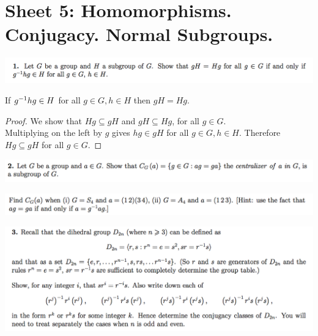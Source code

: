 \documentclass[12pt]{article}
\begin{document}
\section{Sheet 5: Homomorphisms. Conjugacy. Normal Subgroups.}

\begin{mdframed}
\includegraphics[width=400pt]{img/abstract-algebra-oxford-M1-5-1.png}
\end{mdframed}

\begin{claim*}
  If $g^{-1}hg \in H$ for all $g \in G, h \in H$ then $gH = Hg$.
\end{claim*}

\begin{proof} We show that $Hg \subseteq gH$ and $gH \subseteq Hg$, for all $g \in G$.\\

Multiplying on the left by $g$ gives $hg \in gH$ for all $g \in G, h \in H$. Therefore $Hg \subseteq gH$ for all $g \in G$.
\end{proof}

\begin{mdframed}
\includegraphics[width=400pt]{img/abstract-algebra-oxford-M1-5-2-1.png}
\end{mdframed}

\begin{mdframed}
\includegraphics[width=400pt]{img/abstract-algebra-oxford-M1-5-2-2.png}
\end{mdframed}

\begin{mdframed}
\includegraphics[width=400pt]{img/abstract-algebra-oxford-M1-5-3.png}
\end{mdframed}
\end{document}
